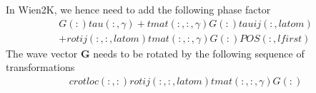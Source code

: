 \documentclass[aps,prb,floatfix,epsfig,twocolumn,showpacs,preprintnumbers]{revtex4}
\newcommand{\vG}{{\mathbf{G}}}
\begin{document}
In Wien2K, we hence need to add the following phase factor
\begin{eqnarray}
G(:) tau(:,\gamma)+tmat(:,:,\gamma)G(:)tauij(:,latom)\\
+rotij(:,:,latom)tmat(:,:,\gamma)G(:)POS(:,lfirst)
\end{eqnarray}
The wave vector $\vG$ needs to be rotated by the following sequence of
transformations
\begin{eqnarray}
 crotloc(:,:) rotij(:,:,latom) tmat(:,:,\gamma)G(:)
\end{eqnarray}
\end{document}
